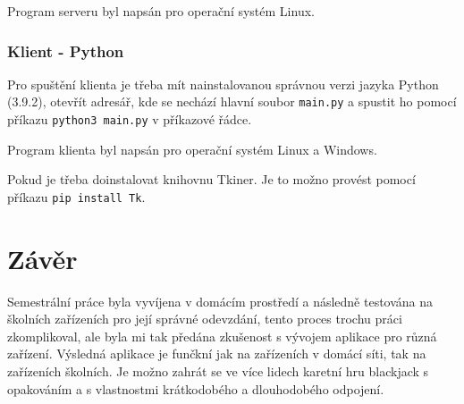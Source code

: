 \documentclass{article}
\begin{document}
Program serveru byl napsán pro operační systém Linux.

\subsubsection{Klient - Python}

Pro spuštění klienta je třeba mít nainstalovanou správnou verzi jazyka Python (3.9.2), otevřít adresář, kde se nechází hlavní soubor \texttt{main.py} a spustit ho pomocí příkazu \texttt{python3 main.py} v příkazové řádce.

Program klienta byl napsán pro operační systém Linux a Windows.

Pokud je třeba doinstalovat knihovnu Tkiner. Je to možno provést pomocí příkazu \texttt{pip install Tk}.

\section{Závěr}
Semestrální práce byla vyvíjena v domácím prostředí a následně testována na školních zařízeních pro její správné odevzdání, tento proces trochu práci zkomplikoval, ale byla mi tak předána zkušenost s vývojem aplikace pro různá zařízení. Výsledná aplikace je funčkní jak na zařízeních v domácí síti, tak na zařízeních školních. Je možno zahrát se ve více lidech karetní hru blackjack s opakováním a s vlastnostmi krátkodobého a dlouhodobého odpojení.
\end{document}
